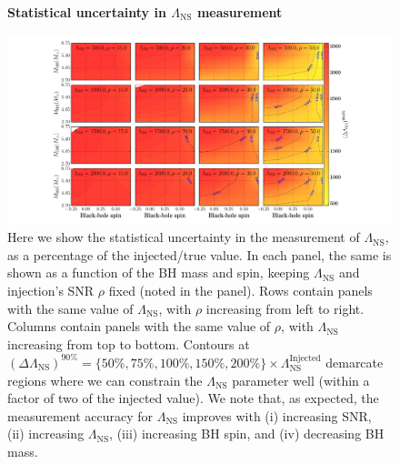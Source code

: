 \documentclass[aps,prd,amsmath,floats,floatfix, twocolumn,
superscriptaddress,nofootinbib,showpacs]{revtex4-1}
\newcommand{\lambdans}{\Lambda_\mathrm{NS}}
\begin{document}
\begin{figure}
\centering    
\textbf{Statistical uncertainty in $\lambdans$ measurement}\par\medskip
\includegraphics[trim={3cm 0 0 0.5cm},width=2.2\columnwidth]{plots/TTLambdaRawCIWidths90_0_Lambda_SNR}
\caption{Here we show the statistical uncertainty in the measurement of
$\lambdans$, as a percentage of the injected/true value. In each panel, the
same is shown as a function of the BH mass and spin, keeping $\lambdans$ and
injection's SNR $\rho$ fixed (noted in the panel). Rows contain panels
with the same value of $\lambdans$, with $\rho$ increasing from left to right.
Columns contain panels with the same value of $\rho$, with $\lambdans$ 
increasing from top to bottom.
% 
Contours at $(\Delta\lambdans)^{90\%}=\{50\%, 75\%, 100\%, 150\%, 200\%\}\times\lambdans^\mathrm{Injected}$ demarcate regions where we can constrain the
$\lambdans$ parameter well (within a factor of two of the injected value).
% 
We note that, as expected, the measurement accuracy for $\lambdans$ improves
with (i) increasing SNR, (ii) increasing $\lambdans$, (iii) increasing BH spin,
and (iv) decreasing BH mass.
}
\label{fig:TT_LambdaCIWidths90_0_Lambda_SNR}
\end{figure}
\end{document}
